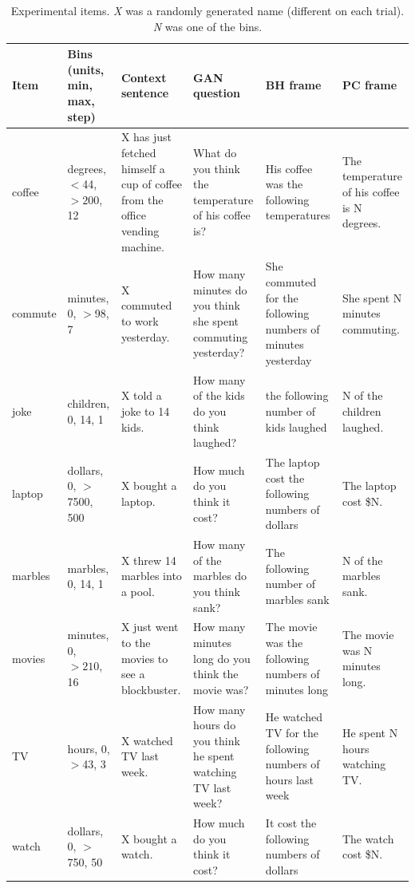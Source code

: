 \documentclass[10pt,letterpaper]{article}
\begin{document}
\begin{table}
  \footnotesize
  \centering
  \begin{tabular}{l p{2.2cm} p{2.5cm} p{3.5cm} p{3cm} p{2.5cm}}
	\toprule
	Item & Bins (units, min, max, step) & Context sentence & GAN question & BH frame & PC frame \\
	\midrule
    coffee & degrees, $<$44, $>200$, 12& X has just fetched himself a cup of coffee from the office vending machine. & What do you think the temperature of his coffee is?  & His coffee was the following temperatures & The temperature of his coffee is N degrees.\\
	commute & minutes, 0, $>$98, 7 & X commuted to work yesterday. & How many minutes do you think she spent commuting yesterday? & She commuted for the following numbers of minutes yesterday & She spent N minutes commuting.\\
	joke & children, 0, 14, 1  & X told a joke to 14 kids. & How many of the kids do you think laughed? & the following number of kids laughed & N of the children laughed.\\
    
	laptop & dollars, 0, $>$7500, 500& X bought a laptop. & How much do you think it cost? & The laptop cost the following numbers of dollars & The laptop cost \$N.\\
    marbles & marbles, 0, 14, 1 & X threw 14 marbles into a pool. & How many of the marbles do you think sank? & The following number of marbles sank & N of the marbles sank.\\

	movies & minutes, 0, $>210$, 16& X just went to the movies to see a blockbuster. & How many minutes long do you think the movie was? & The movie was the following numbers of minutes long & The movie was N minutes long.\\

	TV & hours, 0, $>$43, 3& X watched TV last week. & How many hours do you think he spent watching TV last week? & He watched TV for the following numbers of hours last week & He spent N hours watching TV.\\

	watch & dollars, 0, $>$750, 50 & X bought a watch.& How much do you think it cost? & It cost the following numbers of dollars & The watch cost \$N.\\
    \bottomrule
  \end{tabular}
  \caption{Experimental items. \emph{X} was a randomly generated name (different on each trial). \emph{N} was one of the bins.}
  \label{tab:Items}
\end{table}
\end{document}
